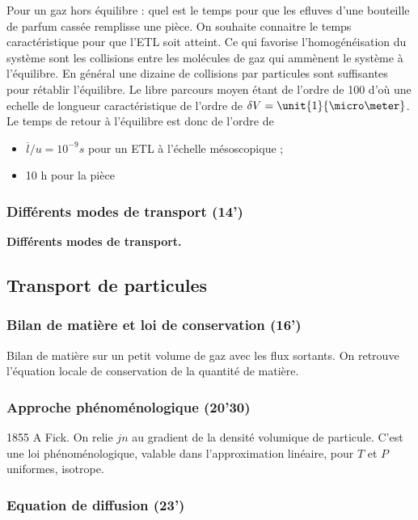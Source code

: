 Pour un gaz hors équilibre : quel est le temps pour que les efluves d'une bouteille de parfum cassée remplisse une pièce.
On souhaite connaitre le temps caractéristique pour que l'ETL soit atteint.
Ce qui favorise l'homogénéisation du système sont les collisions entre les molécules de gaz qui ammènent le système à l'équilibre.
En général une dizaine de collisions par particules sont suffisantes pour rétablir l'équilibre.
Le libre parcours moyen étant de l'ordre de \unit{100}{\nano\meter} d'où une echelle de longueur caractéristique de l'ordre de $\delta V = \unit{1}{\micro\meter}$.
Le temps de retour à l'équilibre est donc de l'ordre de
\begin{itemize}
\item $\overline{l}/u = 10^{-9} s$ pour un ETL à l'échelle mésoscopique ;
\item 10 h  pour la pièce
\end{itemize} 

\subsubsection{Différents modes de transport (14')}

\begin{slide}
\textbf{Différents modes de transport.}
\end{slide}

\subsection{Transport de particules}

\subsubsection{Bilan de matière et loi de conservation (16')}

Bilan de matière sur un petit volume de gaz avec les flux sortants.
On retrouve l'équation locale de conservation de la quantité de matière.

\subsubsection{Approche phénoménologique (20'30)}

1855 A Fick.
On relie $jn$ au gradient de la densité volumique de particule.
C'est une loi phénoménologique, valable dans l'approximation linéaire, pour $T$ et $P$ uniformes, isotrope.

\subsubsection{Equation de diffusion (23')}

